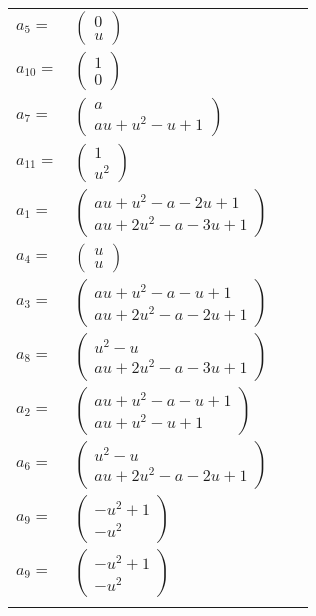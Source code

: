 \documentclass[1p]{elsarticle_modified}
\theoremstyle{definition}
\begin{document}
\begin{tabular}{m{7pt} m{180pt} m{7pt} m{180pt} }
\flushright $a_{5}=$&$\begin{pmatrix}0\\u\end{pmatrix}$ \\
\flushright $a_{10}=$&$\begin{pmatrix}1\\0\end{pmatrix}$ \\
\flushright $a_{7}=$&$\begin{pmatrix}a\\a u+u^2- u+1\end{pmatrix}$ \\
\flushright $a_{11}=$&$\begin{pmatrix}1\\u^2\end{pmatrix}$ \\
\flushright $a_{1}=$&$\begin{pmatrix}a u+u^2- a-2 u+1\\a u+2 u^2- a-3 u+1\end{pmatrix}$ \\
\flushright $a_{4}=$&$\begin{pmatrix}u\\u\end{pmatrix}$ \\
\flushright $a_{3}=$&$\begin{pmatrix}a u+u^2- a- u+1\\a u+2 u^2- a-2 u+1\end{pmatrix}$ \\
\flushright $a_{8}=$&$\begin{pmatrix}u^2- u\\a u+2 u^2- a-3 u+1\end{pmatrix}$ \\
\flushright $a_{2}=$&$\begin{pmatrix}a u+u^2- a- u+1\\a u+u^2- u+1\end{pmatrix}$ \\
\flushright $a_{6}=$&$\begin{pmatrix}u^2- u\\a u+2 u^2- a-2 u+1\end{pmatrix}$ \\
\flushright $a_{9}=$&$\begin{pmatrix}- u^2+1\\- u^2\end{pmatrix}$\\ \flushright $a_{9}=$&$\begin{pmatrix}- u^2+1\\- u^2\end{pmatrix}$\\&\end{tabular}
\end{document}
